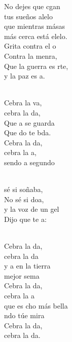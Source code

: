 \documentclass[12pt]{article}
\begin{document}
\begin{multicols*}{2}
\begin{cancion}
	No dejes que cgan\\
	tus sueños alelo\\
	que mientras másas\\
	más cerca está elelo.\\
	Grita contra el o\\
	Contra la menra,\\
	Que la guerra es rte,\\
	y la paz es a.\\\jump\\
	\begin{chorus}%
	Cebra la va, \\
	cebra la da,\\
	Que a se guarda\\
	Que do te bda.\\
\jump
	Cebra la da, \\
	cebra la a,\\
	sendo a segundo  \\
	\end{chorus}%
	\jump\\
	 sé si soñaba,\\
	No sé si doa, \\
	y la voz de un gel\\
	Dijo que te a:\\\jump\\
	\begin{chorus}%
	Cebra la da, \\
	cebra la da\\
	y a en la tierra\\
	 mejor sema\\
	Cebra la da, \\
	cebra la a\\
	que es cho más bella \\
	ndo túe mira\\
	Cebra la da,\\
	cebra la da.\\
	\end{chorus}%
	\jump\\
\end{cancion}%


\end{multicols*}
\end{document}

